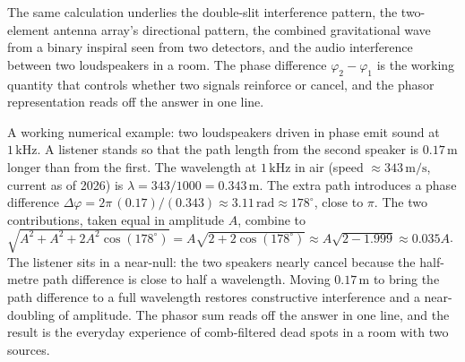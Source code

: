 The same calculation underlies the double-slit interference
pattern, the two-element antenna array's directional pattern, the
combined gravitational wave from a binary inspiral seen from two
detectors, and the audio interference between two loudspeakers in
a room. The phase difference $\varphi_{2} - \varphi_{1}$ is the
working quantity that controls whether two signals reinforce or
cancel, and the phasor representation reads off the answer in one
line.

A working numerical example: two loudspeakers driven in phase emit
sound at $1\,\si{\kilo\hertz}$. A listener stands so that the path
length from the second speaker is $0.17\,\si{\meter}$ longer than
from the first. The wavelength at $1\,\si{\kilo\hertz}$ in air
(speed $\approx 343\,\si{\meter\per\second}$, current as of 2026) is
$\lambda = 343/1000 = 0.343\,\si{\meter}$. The extra path introduces
a phase difference $\Delta\varphi = 2\pi\,(0.17)/(0.343) \approx
3.11\,\text{rad} \approx 178^{\circ}$, close to $\pi$. The two
contributions, taken equal in amplitude $A$, combine to
$\sqrt{A^{2} + A^{2} + 2A^{2}\cos(178^{\circ})} = A\sqrt{2 +
2\cos(178^{\circ})} \approx A\sqrt{2 - 1.999} \approx 0.035 A$. The
listener sits in a near-null: the two speakers nearly cancel because
the half-metre path difference is close to half a wavelength. Moving
$0.17\,\si{\meter}$ to bring the path difference to a full wavelength
restores constructive interference and a near-doubling of amplitude.
The phasor sum reads off the answer in one line, and the result is
the everyday experience of comb-filtered dead spots in a room with
two sources.

